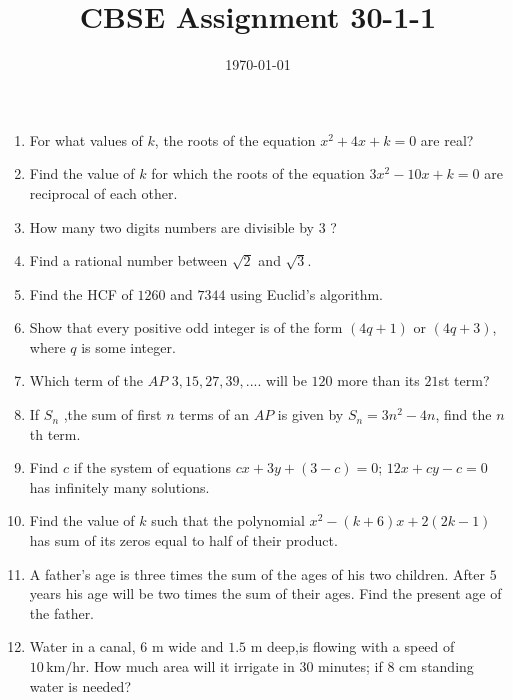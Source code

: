 \documentclass[12pt,-letter paper]{article}
\title{CBSE Assignment 30-1-1}
\date{\today}
\providecommand{\brak}[1]{\ensuremath{\left(#1\right)}}\graphicspath{{/storage/self/primary/Download/latexnew/fig}}
\begin{document}
\maketitle{}
\begin{enumerate}
\section{Algebra}
\item For what values of $k$, the roots of the equation $x^2+4x+k = 0$ are real?
\item Find the value of $k$ for which the roots of the equation $3x^2-10x+k=0$ are reciprocal of each other.
\item How many two digits numbers are divisible by $3$ ?
\item Find a rational number between $\sqrt{2}$ and $\sqrt{3}$.
\item Find the HCF of $1260$ and $7344$ using Euclid's algorithm.
\item Show that every positive odd integer is of the form $\brak{4q+1}$ or $\brak{4q+3}$, where $q$ is some integer.
\item Which term of the $AP$ $3, 15, 27, 39, ....$ will be $120$ more than its $21$st term?
\item If $S_n$ ,the sum of first $n$ terms of an $AP$ is given by $S_n=3n^2-4n$, find the $n$th term.
\item Find $c$ if the system of equations $cx+3y+(3-c)=0$; $12x+cy-c=0$ has infinitely many solutions.
\item Find the value of $k$ such that the polynomial $x^2-\brak{k+6}x+2\brak{2k-1}$ has sum of its zeros equal to half of their product.
\item A father's age is three times the sum of the ages of his two children. After $5$ years his age will be two times the sum of their ages. Find the present age of the father.
\item Water in a canal, $6$ m wide and $1.5$ m deep,is flowing with a speed of $10 \,\text{km/hr}$. How much area will it irrigate in $30$ minutes; if $8$ cm standing water is needed?



\end{enumerate}
\end{document}
